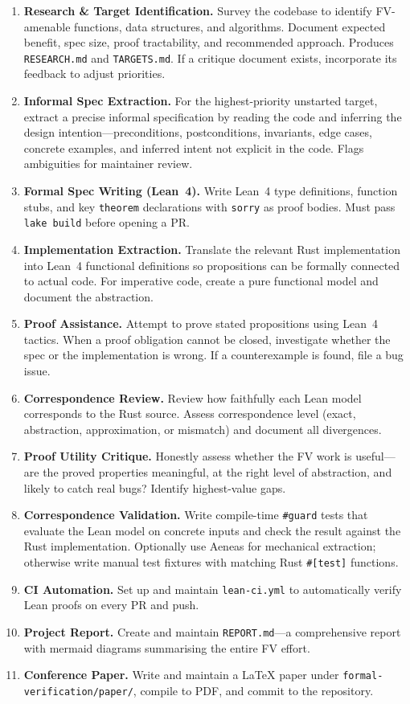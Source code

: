 \documentclass[sigconf,10pt]{acmart}
\begin{document}
\begin{enumerate}\setlength\itemsep{0pt}
\item \textbf{Research \& Target Identification.}
  Survey the codebase to identify FV-amenable functions, data structures,
  and algorithms.  Document expected benefit, spec size, proof
  tractability, and recommended approach.  Produces \texttt{RESEARCH.md}
  and \texttt{TARGETS.md}.  If a critique document exists, incorporate
  its feedback to adjust priorities.
\item \textbf{Informal Spec Extraction.}
  For the highest-priority unstarted target, extract a precise informal
  specification by reading the code and inferring the design intention---preconditions, postconditions, invariants, edge cases, concrete examples,
  and inferred intent not explicit in the code.  Flags ambiguities for
  maintainer review.
\item \textbf{Formal Spec Writing (Lean~4).}
  Write Lean~4 type definitions, function stubs, and key \texttt{theorem}
  declarations with \texttt{sorry} as proof bodies.  Must pass
  \texttt{lake build} before opening a PR.
\item \textbf{Implementation Extraction.}
  Translate the relevant Rust implementation into Lean~4 functional
  definitions so propositions can be formally connected to actual code.
  For imperative code, create a pure functional model and document the
  abstraction.
\item \textbf{Proof Assistance.}
  Attempt to prove stated propositions using Lean~4 tactics.  When a
  proof obligation cannot be closed, investigate whether the spec or the
  implementation is wrong.  If a counterexample is found, file a bug
  issue.
\item \textbf{Correspondence Review.}
  Review how faithfully each Lean model corresponds to the Rust source.
  Assess correspondence level (exact, abstraction, approximation, or
  mismatch) and document all divergences.
\item \textbf{Proof Utility Critique.}
  Honestly assess whether the FV work is useful---are the proved
  properties meaningful, at the right level of abstraction, and likely
  to catch real bugs?  Identify highest-value gaps.
\item \textbf{Correspondence Validation.}
  Write compile-time \texttt{\#guard} tests that evaluate the Lean model
  on concrete inputs and check the result against the Rust implementation.
  Optionally use Aeneas for mechanical extraction; otherwise write
  manual test fixtures with matching Rust \texttt{\#[test]} functions.
\item \textbf{CI Automation.}
  Set up and maintain \texttt{lean-ci.yml} to automatically verify
  Lean proofs on every PR and push.
\item \textbf{Project Report.}
  Create and maintain \texttt{REPORT.md}---a comprehensive report with
  mermaid diagrams summarising the entire FV effort.
\item \textbf{Conference Paper.}
  Write and maintain a LaTeX paper under
  \texttt{formal-verification/paper/}, compile to PDF, and commit to
  the repository.
\end{enumerate}
\end{document}
